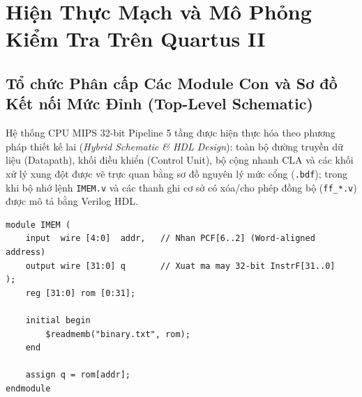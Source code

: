 \documentclass[12pt,a4paper]{report}
\begin{document}
\chapter{Hiện Thực Mạch và Mô Phỏng Kiểm Tra Trên Quartus II}

\section{Tổ chức Phân cấp Các Module Con và Sơ đồ Kết nối Mức Đỉnh (Top-Level Schematic)}

Hệ thống CPU MIPS 32-bit Pipeline 5 tầng được hiện thực hóa theo phương pháp thiết kế lai (\textit{Hybrid Schematic \& HDL Design}): toàn bộ đường truyền dữ liệu (Datapath), khối điều khiển (Control Unit), bộ cộng nhanh CLA và các khối xử lý xung đột được vẽ trực quan bằng sơ đồ nguyên lý mức cổng (\texttt{.bdf}); trong khi bộ nhớ lệnh \texttt{IMEM.v} và các thanh ghi cơ sở có xóa/cho phép đồng bộ (\texttt{ff\_*.v}) được mô tả bằng Verilog HDL.

\begin{lstlisting}[style=verilogstyle, caption={Mô tả bộ nhớ lệnh IMEM.v tự động nạp mã máy từ file binary.txt}, label={lst:imem}]
module IMEM (
    input  wire [4:0]  addr,   // Nhan PCF[6..2] (Word-aligned address)
    output wire [31:0] q       // Xuat ma may 32-bit InstrF[31..0]
);
    reg [31:0] rom [0:31];

    initial begin
        $readmemb("binary.txt", rom);
    end

    assign q = rom[addr];
endmodule
\end{lstlisting}
\end{document}
